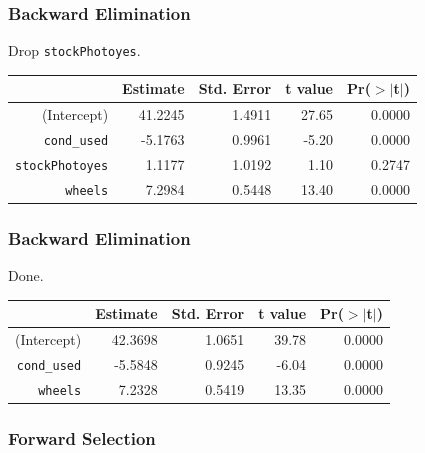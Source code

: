 \documentclass[handout]{beamer}
\newcommand{\blue}[1]{\textcolor{blue2}{#1}}
\begin{document}
\begin{frame}[fragile]
\frametitle{Backward Elimination}
Drop {\tt stockPhotoyes}.

\begin{table}[ht]
\centering
\begin{tabular}{rrrrr}
  \hline
 & Estimate & Std. Error & t value & Pr($>$$|$t$|$) \\ 
  \hline
(Intercept) & 41.2245 & 1.4911 & 27.65 & 0.0000 \\ 
  {\tt cond\_used} & -5.1763 & 0.9961 & -5.20 & 0.0000 \\ 
  \blue{{\tt stockPhotoyes}} & \blue{1.1177} & \blue{1.0192} & \blue{1.10} & \blue{0.2747} \\ 
  {\tt wheels} & 7.2984 & 0.5448 & 13.40 & 0.0000 \\ 
   \hline
\end{tabular}
\end{table}

\end{frame}


\begin{frame}[fragile]
\frametitle{Backward Elimination}
Done.

\begin{table}[ht]
\centering
\begin{tabular}{rrrrr}
  \hline
 & Estimate & Std. Error & t value & Pr($>$$|$t$|$) \\ 
  \hline
(Intercept) & 42.3698 & 1.0651 & 39.78 & 0.0000 \\ 
  {\tt cond\_used} & -5.5848 & 0.9245 & -6.04 & 0.0000 \\ 
  {\tt wheels} & 7.2328 & 0.5419 & 13.35 & 0.0000 \\ 
   \hline
\end{tabular}
\end{table}
 

\end{frame}


\begin{frame}[fragile]
\frametitle{Forward Selection}

%
%

\end{frame}
\end{document}
